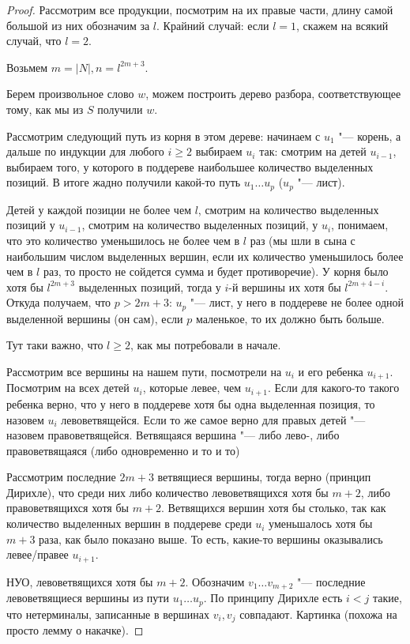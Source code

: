 \begin{proof}
Рассмотрим все продукции, посмотрим на их правые части, длину самой большой из них обозначим за $l$.
Крайний случай: если $l = 1$, скажем на всякий случай, что $l = 2$.

Возьмем $m = |N|, n = l^{2m+3}$.

Берем произвольное слово $w$, можем построить дерево разбора, соответствующее тому, как мы из $S$ получили $w$.

Рассмотрим следующий путь из корня в этом дереве: начинаем с $u_1$ "--- корень, а дальше по индукции для любого $i \geq 2$ выбираем $u_i$ так: 
смотрим на детей $u_{i-1}$, выбираем того, у которого в поддереве наибольшее количество выделенных позиций.
В итоге жадно получили какой-то путь $u_1 \dots u_p$ ($u_p$ "--- лист).

Детей у каждой позиции не более чем $l$, смотрим на количество выделенных позиций у $u_{i-1}$, смотрим на количество выделенных позиций, у $u_i$,
понимаем, что это количество уменьшилось не более чем в $l$ раз
(мы шли в сына с наибольшим числом выделенных вершин, если их количество уменьшилось более чем в $l$ раз, то просто не сойдется сумма и будет противоречие).
У корня было хотя бы $l^{2m+3}$ выделенных позиций, тогда у $i$-й вершины их хотя бы $l^{2m+4-i}$.
Откуда получаем, что $p > 2m+3$: $u_p$ "--- лист, у него в поддереве не более одной выделенной вершины (он сам), если $p$ маленькое, то их должно быть больше.
\begin{Rem}
Тут таки важно, что $l \geq 2$, как мы потребовали в начале. 
\end{Rem}

Рассмотрим все вершины на нашем пути, посмотрели на $u_i$ и его ребенка $u_{i+1}$. 
Посмотрим на всех детей $u_i$, которые левее, чем $u_{i+1}$. 
Если для какого-то такого ребенка верно, что у него в поддереве хотя бы одна выделенная позиция, то назовем $u_i$ левоветвящейся.
Если то же самое верно для правых детей "--- назовем правоветвящейся.
Ветвящаяся вершина "--- либо лево-, либо правоветвящаяся (либо одновременно и то и то)

Рассмотрим последние $2m + 3$ ветвящиеся вершины, тогда верно (принцип Дирихле), что среди них либо количество левоветвящихся хотя бы $m + 2$, либо правоветвящихся хотя бы $m + 2$.
Ветвящихся вершин хотя бы столько, так как количество выделенных вершин в поддереве среди $u_i$ уменьшалось хотя бы $m+3$ раза, как было показано выше.
То есть, какие-то вершины оказывались левее/правее $u_{i+1}$.

НУО, левоветвящихся хотя бы $m + 2$. Обозначим $v_1 \dots v_{m+2}$ "--- последние левоветвящиеся вершины из пути $u_1 \dots u_p$.
По принципу Дирихле есть $i < j$ такие, что нетерминалы, записанные в вершинах $v_i, v_j$ совпадают.
\TODO Картинка (похожа на просто лемму о накачке).


\end{proof}
